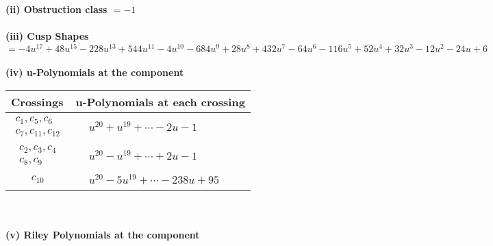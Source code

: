\documentclass[1p]{elsarticle_modified}
\theoremstyle{definition}
\begin{document}
\flushleft \textbf{(ii) Obstruction class $= -1$}\\~\\
\flushleft \textbf{(iii) Cusp Shapes $= -4 u^{17}+48 u^{15}-228 u^{13}+544 u^{11}-4 u^{10}-684 u^9+28 u^8+432 u^7-64 u^6-116 u^5+52 u^4+32 u^3-12 u^2-24 u+6$}\\~\\
\newpage\renewcommand{\arraystretch}{1}
\flushleft \textbf{(iv) u-Polynomials at the component}\newline \\
\begin{tabular}{m{50pt}|m{274pt}}
Crossings & \hspace{64pt}u-Polynomials at each crossing \\
\hline $$\begin{aligned}c_{1},c_{5},c_{6}\\c_{7},c_{11},c_{12}\end{aligned}$$&$\begin{aligned}
&u^{20}+u^{19}+\cdots-2 u-1
\end{aligned}$\\
\hline $$\begin{aligned}c_{2},c_{3},c_{4}\\c_{8},c_{9}\end{aligned}$$&$\begin{aligned}
&u^{20}- u^{19}+\cdots+2 u-1
\end{aligned}$\\
\hline $$\begin{aligned}c_{10}\end{aligned}$$&$\begin{aligned}
&u^{20}-5 u^{19}+\cdots-238 u+95
\end{aligned}$\\
\hline
\end{tabular}\\~\\
\newpage\renewcommand{\arraystretch}{1}
\flushleft \textbf{(v) Riley Polynomials at the component}\newline \\
\end{document}
